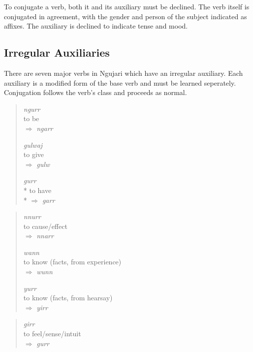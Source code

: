 To conjugate a verb, both it and its auxiliary must be declined. The verb itself
is conjugated in agreement, with the gender and person of the subject indicated
as affixes. The auxiliary is declined to indicate tense and mood.

\subsection{Irregular Auxiliaries}

There are seven major verbs in Ngujari which have an irregular auxiliary. Each
auxiliary is a modified form of the base verb and must be learned seperately.
Conjugation follows the verb's class and proceeds as normal.

\begin{quote}
\begin{multicols}{3}
\textit{ngurr}\\
to be\\
$\Rightarrow$ \textit{ngarr}


\textit{gulwaj}\\
to give\\
$\Rightarrow$ \textit{gulw}


\textit{gurr}\\*
to have\\*
$\Rightarrow$ \textit{garr}
\end{multicols}
\end{quote}

\begin{quote}
\begin{multicols}{3}
\textit{nnurr}\\
to cause/effect\\
$\Rightarrow$ \textit{nnarr}


\textit{wann}\\
to know (facts, from experience)\\
$\Rightarrow$ \textit{wunn}


\textit{yurr}\\
to know (facts, from hearsay)\\
$\Rightarrow$ \textit{yirr}
\end{multicols}
\end{quote}

\begin{quote}
\textit{girr}\\
to feel/sense/intuit\\
$\Rightarrow$ \textit{gurr}
\end{quote}

